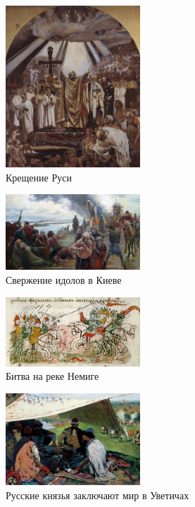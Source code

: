 \begin{figure}[ht]
    \centering
    \includegraphics[width=0.45\textwidth]{img/rus/2.jpg}
    \caption{Крещение Руси}
    \label{fig:chresh}
\end{figure}

\begin{figure}[ht]
    \centering
    \includegraphics[width=0.45\textwidth]{img/rus/sverzh.jpg}
    \caption{Свержение идолов в Киеве}
    \label{fig:sverzh}
\end{figure}

\begin{figure}[ht]
    \centering
    \includegraphics[width=0.45\textwidth]{img/rus/3.jpg}
    \caption{Битва на реке Немиге}
    \label{fig:nemiga}
\end{figure}

\begin{figure}[ht]
    \centering
    \includegraphics[width=0.45\textwidth]{img/rus/uvetichi.jpg}
    \caption{Русские князья заключают мир в Уветичах}
    \label{fig:uvetichi}
\end{figure}

